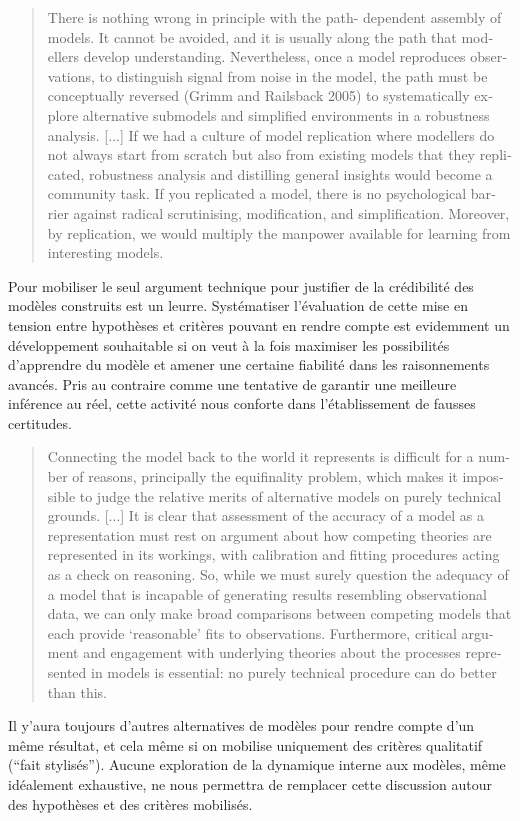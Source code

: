 \foreignblockquote{english}[\cite{Thiele2015}]{There is nothing wrong in principle with the path- dependent assembly of models. It cannot be avoided, and it is usually along the path that modellers develop understanding. Nevertheless, once a model reproduces observations, to distinguish signal from noise in the model, the path must be conceptually reversed (Grimm and Railsback 2005) to systematically explore alternative submodels and simplified environments in a robustness analysis. [...] If we had a culture of model replication where modellers do not always start from scratch but also from existing models that they replicated, robustness analysis and distilling general insights would become a community task. If you replicated a model, there is no psychological barrier against radical scrutinising, modification, and simplification. Moreover, by replication, we would multiply the manpower available for learning from interesting models.}

Pour \autocite{OSullivan2004} mobiliser le seul argument technique pour justifier de la crédibilité des modèles construits est un leurre. Systématiser l'évaluation de cette mise en tension entre hypothèses et critères pouvant en rendre compte est evidemment un développement souhaitable si on veut à la fois maximiser les possibilités d'apprendre du modèle et amener une certaine fiabilité dans les raisonnements avancés. Pris au contraire comme une tentative de garantir une meilleure inférence au réel, cette activité nous conforte dans l'établissement de fausses certitudes. 

\foreignblockquote{english}[\cite{OSullivan2004}]{Connecting the model back to the world it represents is difficult for a number of reasons, principally the equifinality problem, which makes it impossible to judge the relative merits of alternative models on purely technical grounds. [...] It is clear that assessment of the accuracy of a model as a representation must rest on argument about how competing theories are represented in its workings, with calibration and fitting procedures acting as a check on reasoning. So, while we must surely question the adequacy of a model that is incapable of generating results resembling observational data, we can only make broad comparisons between competing models that each provide ‘reasonable’ fits to observations. Furthermore, critical argument and engagement with underlying theories about the processes represented in models is essential: no purely technical procedure can do better than this.}

Il y'aura toujours d'autres alternatives de modèles pour rendre compte d'un même résultat, et cela même si on mobilise uniquement des critères qualitatif (\enquote{fait stylisés}). Aucune exploration de la dynamique interne aux modèles, même idéalement exhaustive, ne nous permettra de remplacer cette discussion autour des hypothèses et des critères mobilisés.

